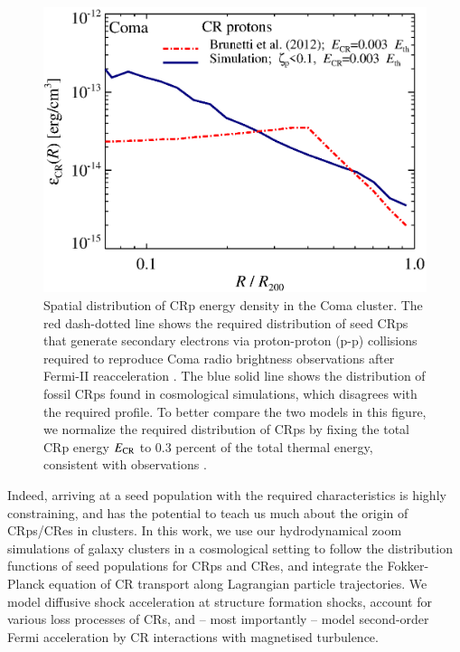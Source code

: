 \documentclass[fleqn,usenatbib,useAMS]{mnras}
\begin{document}
\begin{figure}
  \includegraphics[width=1.0\columnwidth]{fCR.radius.coma.g72a.Rad14.2400p.z0.NL.xKR.eb23.eI067.DII.140.v6.eps}
  \caption{Spatial distribution of CRp energy density in the Coma
    cluster. The red dash-dotted line shows the required distribution
    of seed CRps that generate secondary electrons via proton-proton
    (p-p) collisions required to reproduce Coma radio brightness
    observations after Fermi-II reacceleration \citep{brunetti12}. The
    blue solid line shows the distribution of fossil CRps found in
    cosmological simulations, which disagrees with the required
    profile. To better compare the two models in this figure, we
    normalize the required distribution of CRps by fixing the total
    CRp energy $E_{\mathrm{CR}}$ to 0.3 percent of the total thermal
    energy, consistent with observations
    \citep{2014ApJ...787...18A,2012ApJ...757..123A}.}
  \label{fig:Edens}
\end{figure}

Indeed, arriving at a seed population with the required
characteristics is highly constraining, and has the potential to teach
us much about the origin of CRps/CRes in clusters.  In this work, we
use our hydrodynamical zoom simulations of galaxy clusters in a
cosmological setting to follow the distribution functions of seed
populations for CRps and CRes, and integrate the Fokker-Planck
equation of CR transport along Lagrangian particle trajectories. We
model diffusive shock acceleration at structure formation shocks,
account for various loss processes of CRs, and -- most importantly --
model second-order Fermi acceleration by CR interactions with
magnetised turbulence.
\end{document}
